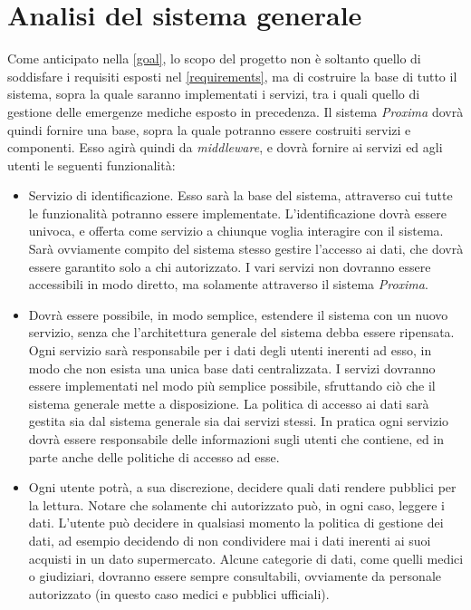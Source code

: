 \documentclass[a4paper,12pt]{report}
\begin{document}
\section{Analisi del sistema generale} \label{general_system_analysis}
Come anticipato nella \autoref{goal}, lo scopo del progetto non è soltanto quello di soddisfare i requisiti esposti nel \autoref{requirements}, ma di costruire la base di tutto il sistema, sopra la quale saranno implementati i servizi, tra i quali quello di gestione delle emergenze mediche esposto in precedenza. Il sistema \emph{Proxima} dovrà quindi fornire una base, sopra la quale potranno essere costruiti servizi e componenti. Esso agirà quindi da \emph{middleware}, e dovrà fornire ai servizi ed agli utenti le seguenti funzionalità:
\begin{itemize}
	\item Servizio di identificazione. Esso sarà la base del sistema, attraverso cui tutte le funzionalità potranno essere implementate. L'identificazione dovrà essere univoca, e offerta come servizio a chiunque voglia interagire con il sistema. Sarà ovviamente compito del sistema stesso gestire l'accesso ai dati, che dovrà essere garantito solo a chi autorizzato. I vari servizi non dovranno essere accessibili in modo diretto, ma solamente attraverso il sistema \emph{Proxima}.
	\item Dovrà essere possibile, in modo semplice, estendere il sistema con un nuovo servizio, senza che l'architettura generale del sistema debba essere ripensata. Ogni servizio sarà responsabile per i dati degli utenti inerenti ad esso, in modo che non esista una unica base dati centralizzata. I servizi dovranno essere implementati nel modo più semplice possibile, sfruttando ciò che il sistema generale mette a disposizione. La politica di accesso ai dati sarà gestita sia dal sistema generale sia dai servizi stessi. In pratica ogni servizio dovrà essere responsabile delle informazioni sugli utenti che contiene, ed in parte anche delle politiche di accesso ad esse.
	\item Ogni utente potrà, a sua discrezione, decidere quali dati rendere pubblici per la lettura. Notare che solamente chi autorizzato può, in ogni caso, leggere i dati. L'utente può decidere in qualsiasi momento la politica di gestione dei dati, ad esempio decidendo di non condividere mai i dati inerenti ai suoi acquisti in un dato supermercato. Alcune categorie di dati, come quelli medici o giudiziari, dovranno essere sempre consultabili, ovviamente da personale autorizzato (in questo caso medici e pubblici ufficiali).

\end{itemize}
\end{document}
